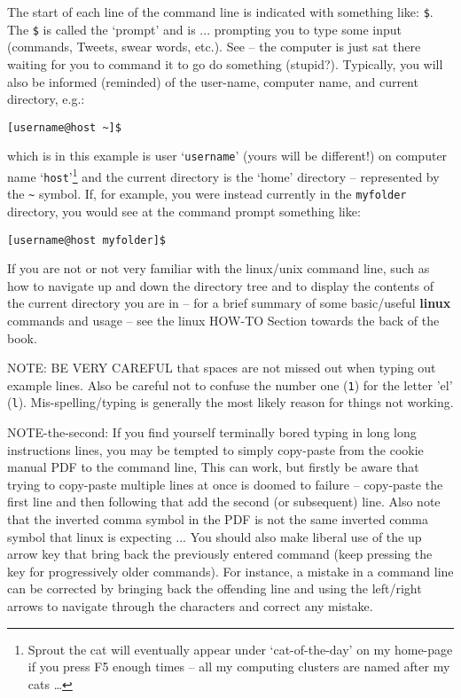 The start of each line of the command line is indicated with something like: \texttt{\$}. The \texttt{\$} is called the ‘prompt’ and is ... prompting you to type some input (commands, Tweets, swear words, etc.). See – the computer is just sat there waiting for you to command it to go do something (stupid?). Typically, you will also be informed (reminded) of the user-name, computer name, and current directory, e.g.:

\vspace{-2mm}
\begin{verbatim}
[username@host ~]$
\end{verbatim}
\vspace{-2mm}

\noindent which is in this example is user ‘\texttt{username}’ (yours will be different!) on computer name ‘\texttt{host}’\footnote{Sprout the cat will eventually appear under ‘cat-of-the-day’ on my home-page if you press \textsf{F5} enough times – all my computing clusters are named after my cats …} and the current directory is the ‘home’ directory -- represented by the \texttt{\~} symbol. If, for example, you were instead currently in the \texttt{myfolder} directory, you would see at the command prompt something like:

\vspace{-2mm}
\begin{verbatim}
[username@host myfolder]$
\end{verbatim}
\vspace{-2mm}

If you are not or not very familiar with the linux/unix command line, such as how to navigate up and down the directory tree and to display the contents of the current directory you are in – for a brief summary of some basic/useful \textbf{linux} commands and usage -- see the linux HOW-TO Section towards the back of the book.

NOTE: BE VERY CAREFUL that spaces are not missed out when typing out example lines. Also be careful not to confuse the number one (\texttt{1}) for the letter 'el' (\texttt{l}). Mis-spelling/typing is generally the most likely reason for things not working.

NOTE-the-second: If you find yourself terminally bored typing in long long instructions lines, you may be tempted to simply copy-paste from the cookie manual PDF to the command line, This can work, but firstly be aware that trying to copy-paste multiple lines at once is doomed to failure -- copy-paste the first line and then following that add the second (or subsequent) line.
Also note that the inverted comma symbol in the PDF is not the same inverted comma symbol that linux is expecting ... You should also make liberal use of the up arrow key that bring back the previously entered command (keep pressing the key for progressively older commands). For instance, a mistake in a command line can be corrected by bringing back the offending line and using the left/right arrows to navigate through the characters and correct any mistake.

